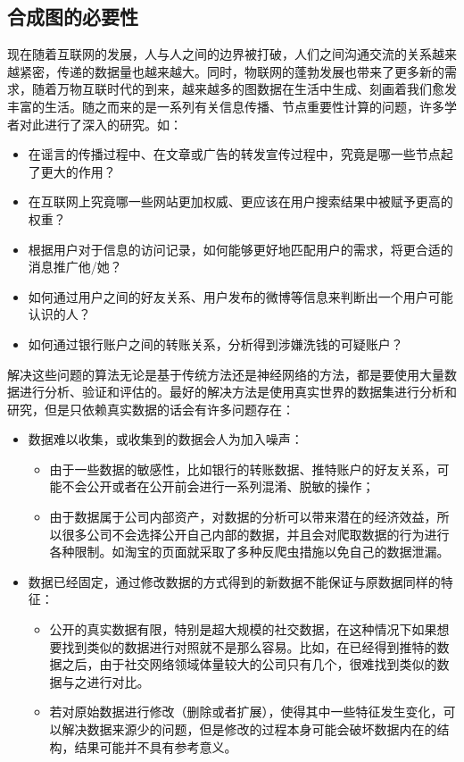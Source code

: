\subsection{合成图的必要性}

现在随着互联网的发展，人与人之间的边界被打破，人们之间沟通交流的关系越来越紧密，传递的数据量也越来越大。同时，物联网的蓬勃发展也带来了更多新的需求，随着万物互联时代的到来，越来越多的图数据在生活中生成、刻画着我们愈发丰富的生活。随之而来的是一系列有关信息传播、节点重要性计算的问题，许多学者对此进行了深入的研究。如：

\begin{itemize}
  \item 在谣言的传播过程中\cite{daley1965stochastic}\cite{maki1973mathematical}、在文章或广告的转发宣传过程中，究竟是哪一些节点起了更大的作用？
  \item 在互联网上究竟哪一些网站更加权威、更应该在用户搜索结果中被赋予更高的权重？
  \item 根据用户对于信息的访问记录，如何能够更好地匹配用户的需求，将更合适的消息推广他/她？
  \item 如何通过用户之间的好友关系、用户发布的微博等信息来判断出一个用户可能认识的人？
  \item 如何通过银行账户之间的转账关系，分析得到涉嫌洗钱的可疑账户？
\end{itemize}

\vspace{0.2cm}

解决这些问题的算法无论是基于传统方法还是神经网络的方法，都是要使用大量数据进行分析、验证和评估的。最好的解决方法是使用真实世界的数据集进行分析和研究，但是只依赖真实数据的话会有许多问题存在：

\begin{itemize}
  \item 数据难以收集，或收集到的数据会人为加入噪声：
  \begin{itemize}
    \item 由于一些数据的敏感性，比如银行的转账数据、推特账户的好友关系，可能不会公开或者在公开前会进行一系列混淆、脱敏的操作；
    \item 由于数据属于公司内部资产，对数据的分析可以带来潜在的经济效益，所以很多公司不会选择公开自己内部的数据，并且会对爬取数据的行为进行各种限制。如淘宝的页面就采取了多种反爬虫措施以免自己的数据泄漏。
  \end{itemize}
  \item 数据已经固定，通过修改数据的方式得到的新数据不能保证与原数据同样的特征：
  \begin{itemize}
    \item 公开的真实数据有限，特别是超大规模的社交数据，在这种情况下如果想要找到类似的数据进行对照就不是那么容易。比如，在已经得到推特的数据之后，由于社交网络领域体量较大的公司只有几个，很难找到类似的数据与之进行对比。
    \item 若对原始数据进行修改（删除或者扩展），使得其中一些特征发生变化，可以解决数据来源少的问题，但是修改的过程本身可能会破坏数据内在的结构，结果可能并不具有参考意义。
  \end{itemize}
\end{itemize}

